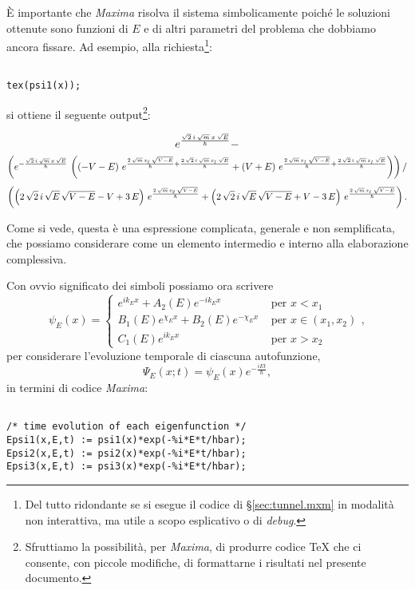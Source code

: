 \`E importante che \emph{Maxima} risolva il sistema simbolicamente 
poiché le soluzioni ottenute sono funzioni di $E$ e di altri
parametri del problema che dobbiamo ancora fissare. Ad esempio, 
alla richiesta\footnote{ Del tutto ridondante se si esegue il codice
di \S\ref{sec:tunnel.mxm} in modalità non interattiva, ma utile a scopo
esplicativo o di \emph{debug}.}:
\begin{lstlisting}

tex(psi1(x));

\end{lstlisting}
si ottiene il seguente output\footnote{ Sfruttiamo la possibilità,
per \emph{Maxima}, di produrre codice {\TeX} che ci consente,
con piccole modifiche, di formattarne i risultati nel presente documento.}:


{\scriptsize
$$ %
e^{{{\sqrt{2}\,i\,\sqrt{m}\,x\,\sqrt{E}}\over{{\it \hbar}}}} - 
$$
$$
 \left({e ^ {- {{\sqrt{2}\,i\,\sqrt{m}\,x\,\sqrt{E}}\over{{\it \hbar}}} }\,
 \left(\left(-V-E\right)\,e^{{{2\,\sqrt{m}\,{\it x_2}\,\sqrt{V-E}
 }\over{{\it \hbar}}}+{{2\,\sqrt{2}\,i\,\sqrt{m}\,{\it x_1}\,\sqrt{E}
 }\over{{\it \hbar}}}}+\left(V+E\right)\,e^{{{2\,\sqrt{m}\,{\it x_1}\,
 \sqrt{V-E}}\over{{\it \hbar}}}+{{2\,\sqrt{2}\,i\,\sqrt{m}\,{\it x_1}
 \,\sqrt{E}}\over{{\it \hbar}}}}\right)}\right) /
$$
$$
 \left({\left(2\,\sqrt{2}\,i\,
 \sqrt{E}\,\sqrt{V-E}-V+3\,E\right)\,e^{{{2\,\sqrt{m}\,{\it x_2}\,
 \sqrt{V-E}}\over{{\it \hbar}}}}+\left(2\,\sqrt{2}\,i\,\sqrt{E}\,
 \sqrt{V-E}+V-3\,E\right)\,e^{{{2\,\sqrt{m}\,{\it x_1}\,\sqrt{V-E}
 }\over{{\it \hbar}}}}}\right) .
$$
}

Come si vede, questa è una espressione complicata,
generale e non semplificata, che possiamo considerare come un
elemento intermedio e interno alla elaborazione complessiva.

Con ovvio significato dei simboli possiamo ora scrivere
\[
\psi_E(x) = \begin{cases}
	e^{ik_{E}x} + A_2(E) e^{-ik_{E}x}	&\text{ per } x<x_1\\
	B_1(E) e^{\chi_{E}x} + B_2(E) e^{-\chi_{E}x} &\text{ per } x\in(x_1, x_2)\\
	C_1(E) e^{ik_{E}x}			&\text{ per } x>x_2
\end{cases},
\]
per considerare l'evoluzione temporale di ciascuna autofunzione,
\[
\Psi_E(x;t) = \psi_E(x) e^{-\frac{iEt}{\hbar}} ,
\]
in termini di codice \emph{Maxima}:
\begin{lstlisting}

/* time evolution of each eigenfunction */
Epsi1(x,E,t) := psi1(x)*exp(-%i*E*t/hbar);
Epsi2(x,E,t) := psi2(x)*exp(-%i*E*t/hbar);
Epsi3(x,E,t) := psi3(x)*exp(-%i*E*t/hbar);
\end{lstlisting}

